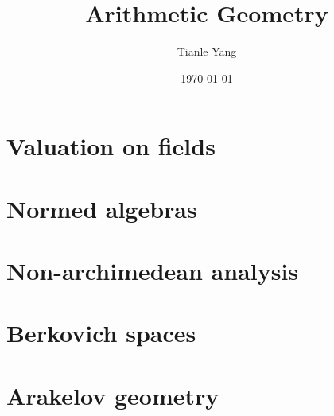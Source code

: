 \documentclass[sectionlevel=book]{noteformyself}
\title{Arithmetic Geometry}
\author{Tianle Yang}
\date{\today}
\begin{document}
    \maketitle

    \frontmatter

    \tableofcontents %

    \mainmatter

    \chapter{Valuation on fields}
        
        
        
        


    \chapter{Normed algebras}
        
        
        


    \chapter{Non-archimedean analysis}
        
        
        
        


    \chapter{Berkovich spaces}
        
        
        
        


    \chapter{Arakelov geometry}
        
        
        
        
        
\end{document}
